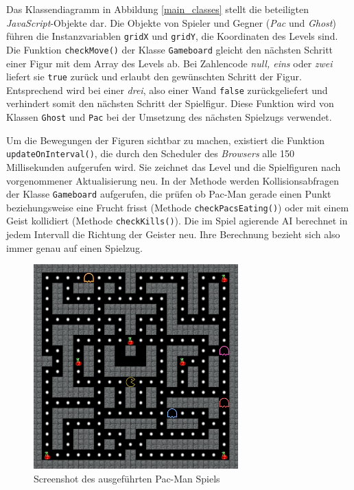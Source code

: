 \documentclass[conference]{IEEEtran}
\begin{document}
Das Klassendiagramm in Abbildung \ref{main_classes} stellt die beteiligten \emph{JavaScript}-Objekte dar. Die Objekte von Spieler und Gegner (\emph{Pac} und \emph{Ghost}) führen die Instanzvariablen \texttt{gridX} und \texttt{gridY}, die Koordinaten des Levels sind. Die Funktion \texttt{checkMove()} der Klasse \texttt{Gameboard} gleicht den nächsten Schritt einer Figur mit dem Array des Levels ab. Bei Zahlencode \emph{null, eins} oder \emph{zwei} liefert sie \texttt{true} zurück und erlaubt den gewünschten Schritt der Figur. Entsprechend wird bei einer \emph{drei}, also einer Wand \texttt{false} zurückgeliefert und verhindert somit den nächsten Schritt der Spielfigur. Diese Funktion wird von Klassen \texttt{Ghost} und \texttt{Pac} bei der Umsetzung des nächsten Spielzugs verwendet.

Um die Bewegungen der Figuren sichtbar zu machen, existiert die Funktion\texttt{ updateOnInterval()}, die durch den Scheduler des \emph{Browsers} alle 150 Millisekunden aufgerufen wird. Sie zeichnet das Level und die Spielfiguren nach vorgenommener Aktualisierung neu. In der Methode werden Kollisionsabfragen der Klasse \texttt{Gameboard} aufgerufen, die prüfen ob Pac-Man gerade einen Punkt beziehungsweise eine Frucht frisst (Methode \texttt{checkPacsEating()}) oder mit einem Geist kollidiert (Methode \texttt{checkKills()}). Die im Spiel agierende AI berechnet in jedem Intervall die Richtung der Geister neu. Ihre Berechnung bezieht sich also immer genau auf einen Spielzug.

\begin{figure}[!t]
\centering
\includegraphics[width=3.1in]{screenshot.png}

\caption{Screenshot des ausgeführten Pac-Man Spiels}
\label{pac_screen}
\end{figure}
\end{document}
